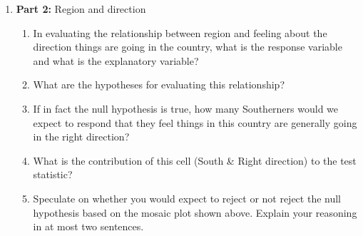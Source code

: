 \documentclass[11pt]{article}
\newcommand{\soln}[1]{}
\begin{document}
\begin{enumerate}
\item \textbf{Part 2:} Region and direction
\begin{enumerate}

\item In evaluating the relationship between region and feeling about the direction things are going in the country, what is the response variable and what is the explanatory variable?

\soln{response - direction, explanatory - region}

\item What are the hypotheses for evaluating this relationship?

\soln{$H_0:$ Region and opinion on direction are independent. \\
$H_A:$ Region and opinion on direction are dependent. \\
}

\item If in fact the null hypothesis is true, how many Southerners would we expect to respond that they feel things in this country are generally going in the right direction?

\soln{$E = \frac{193 \times 171}{500} = 66.006$}

\item What is the contribution of this cell (South \& Right direction) to the test statistic?

\soln{$\frac{(62 - 66.006)^2}{66.006} = 0.24313$}

\item Speculate on whether you would expect to reject or not reject the null hypothesis based on the mosaic plot shown above. Explain your reasoning in at most two sentences.

\soln{No, \\
P(right direction $|$ each level of the region variable) is roughly equal, chances are we won't reject $H_0$.}

\end{enumerate}

\end{enumerate}
\end{document}

